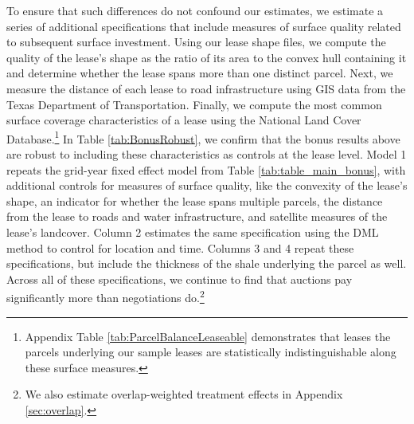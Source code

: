 \documentclass[12pt]{article}
\begin{document}
To ensure that such differences do not confound our estimates, we estimate a series of additional specifications that include  measures of surface quality related to subsequent surface investment.  Using our lease shape files, we compute the quality of the lease's shape as the ratio of its area to the convex hull containing it and determine whether the lease spans more than one distinct parcel.  Next, we measure the distance of each lease to road infrastructure using GIS data from the Texas Department of Transportation.  Finally, we compute the most common surface coverage characteristics of a lease using the National Land Cover Database.\footnote{Appendix Table \ref{tab:ParcelBalanceLeaseable} demonstrates that leases the parcels underlying our sample leases are statistically indistinguishable along these surface measures.}  In Table \ref{tab:BonusRobust}, we confirm that the bonus results above are robust to including these characteristics as controls at the lease level. Model 1 repeats the grid-year fixed effect model from Table \ref{tab:table_main_bonus}, with additional controls for measures of surface quality, like the convexity of the lease's shape, an indicator for whether the lease spans multiple parcels, the distance from the lease to roads and water infrastructure, and satellite measures of the lease's landcover. Column 2 estimates the same specification using the DML method to control for location and time. Columns 3 and 4 repeat these specifications, but include the thickness of the shale underlying the parcel as well. Across all of these specifications, we continue to find that auctions pay significantly more than negotiations do.\footnote{We also estimate overlap-weighted treatment effects in Appendix \ref{sec:overlap}.}
\end{document}
